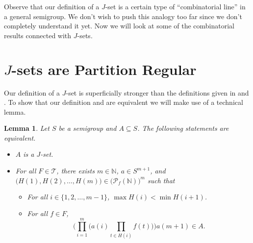 \documentclass[12pt]{article}
\theoremstyle{plain}
\newtheorem{lem}[thm]{Lemma}
\theoremstyle{definition}
\newcommand{\bbN}{\mathbb{N}}
\newcommand{\calT}{\mathcal{T}}
\newcommand{\Pf}{\mathcal{P}_f}
\begin{document}
Observe that our definition of a $J$-set is a certain type of
``combinatorial line'' in a general semigroup.
We don't wish to push this analogy too far since we don't completely
understand it yet.
Now we will look at some of the combinatorial results connected with
$J$-sets.

\section{$J$-sets are Partition Regular}
Our definition of a $J$-set is superficially stronger than the
definitions given in \cite[Definition 2.3(d)]{Hindman:2010fk} and
\cite[Definition 3.3(e)]{De:2008uq}. 
To show that our definition and \cite[Definition
2.3(d)]{Hindman:2010fk} are equivalent we will make use of a technical
lemma.

\begin{lem}
  Let $S$ be a semigroup and $A \subseteq S$.
  The following statements are equivalent.
  \begin{itemize}
    \item[(a)] $A$ is a $J$-set.
    
    \item[(b)] For all $F \in \calT$, there exists $m \in \bbN$, $a
      \in S^{m+1}$, and $\bigl( H(1), H(2), \ldots, H(m) \bigr) \in
      \bigr(\Pf(\bbN)\bigl)^m$ such that 
      \begin{itemize}
        \item[(i)] For all $i \in \{1, 2, \ldots, m-1 \}$, $\max H(i) <
        \min H(i+1)$.
       
        \item[(ii)] For all $f \in F$, 
          \[
            \biggl( \prod_{i=1}^m \bigl( a(i) \prod_{t \in H(i)} f(t)
            \bigr) \biggr) a(m+1) \in A.
          \]
      \end{itemize}
  \end{itemize}
\end{lem}
\end{document}

